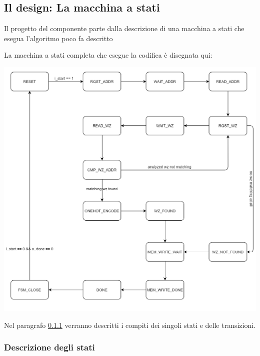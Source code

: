 \documentclass{article}
\begin{document}
\subsection{Il design: La macchina a stati}

Il progetto del componente parte dalla descrizione di una macchina a stati che esegua l'algoritmo poco fa descritto

La macchina a stati completa che esegue la codifica è disegnata qui:

\begin{flushleft}
\includegraphics[scale=0.40]{FSM}
\end{flushleft}

Nel paragrafo \ref{fsm} verranno descritti i compiti dei singoli stati e delle transizioni.

\newpage

\subsubsection{Descrizione degli stati}\label{fsm}
\end{document}
